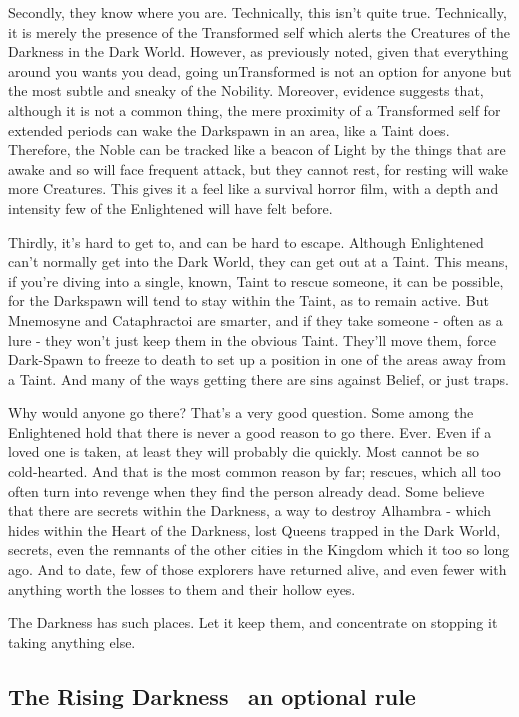 Secondly, they know where you are. Technically, this isn't quite true. Technically, it is merely the presence of the Transformed self which alerts the Creatures of the Darkness in the Dark World. However, as previously noted, given that everything around you wants you dead, going unTransformed is not an option for anyone but the most subtle and sneaky of the Nobility. Moreover, evidence suggests that, although it is not a common thing, the mere proximity of a Transformed self for extended periods can wake the Darkspawn in an area, like a Taint does. Therefore, the Noble can be tracked like a beacon of Light by the things that are awake and so will face frequent attack, but they cannot rest, for resting will wake more Creatures. This gives it a feel like a survival horror film, with a depth and intensity few of the Enlightened will have felt before.

Thirdly, it's hard to get to, and can be hard to escape. Although Enlightened can't normally get into the Dark World, they can get out at a Taint. This means, if you're diving into a single, known, Taint to rescue someone, it can be possible, for the Darkspawn will tend to stay within the Taint, as to remain active. But Mnemosyne and Cataphractoi are smarter, and if they take someone - often as a lure - they won't just keep them in the obvious Taint. They'll move them, force Dark-Spawn to freeze to death to set up a position in one of the areas away from a Taint. And many of the ways getting there are sins against Belief, or just traps.

Why would anyone go there? That's a very good question. Some among the Enlightened hold that there is never a good reason to go there. Ever. Even if a loved one is taken, at least they will probably die quickly. Most cannot be so cold-hearted. And that is the most common reason by far; rescues, which all too often turn into revenge when they find the person already dead. Some believe that there are secrets within the Darkness, a way to destroy Alhambra - which hides within the Heart of the Darkness, lost Queens trapped in the Dark World, secrets, even the remnants of the other cities in the Kingdom which it too so long ago. And to date, few of those explorers have returned alive, and even fewer with anything worth the losses to them and their hollow eyes.

The Darkness has such places. Let it keep them, and concentrate on stopping it taking anything else. 

\subsection*{The Rising Darkness \textemdash\, an optional rule}

